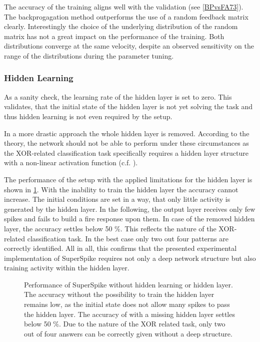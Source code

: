 The accuracy of the training aligns well with the validation (see \cref{BPvsFA73}). The backprogagation method outperforms the use of a random feedback matrix clearly. Interestingly the choice of the underlying distribution of the random matrix has not a great impact on the performance of the training. Both distributions converge at the same velocity, despite an observed sensitivity on the range of the distributions during the parameter tuning.

\subsubsection*{Hidden Learning}
As a sanity check, the learning rate of the hidden layer is set to zero. This validates, that the initial state of the hidden layer is not yet solving the task and thus hidden learning is not even required by the setup.

In a more drastic approach the whole hidden layer is removed. According to the theory, the network should not be able to perform under these circumstances as the XOR-related classification task specifically requires a hidden layer structure with a non-linear activation function (c.f. \citealp{Goodfellow-et-al-2016}).

The performance of the setup with the applied limitations for the hidden layer is shown in \cref{hiddenlearning}. With the inability to train the hidden layer the accuracy cannot increase. The initial conditions are set in a way, that only little activity is generated by the hidden layer. In the following, the output layer receives only few spikes and fails to build a fire response upon them. In case of the removed hidden layer, the accuracy settles below 50 \%. This reflects the nature of the XOR-related classification task. In the best case only two out four patterns are correctly identified. 
All in all, this confirms that the presented experimental implementation of SuperSpike requires not only a deep network structure but also training activity within the hidden layer.

\begin{figure}[htb!]
		\centering
		
	\caption[Performance of SuperSpike without hidden learning or hidden layer.]{Performance of SuperSpike without hidden learning or hidden layer. The accuracy without the possibility to train the hidden layer remains low, as the initial state does not allow many spikes to pass the hidden layer. The accuracy of with a missing hidden layer settles below 50 \%. Due to the nature of the XOR related task, only two out of four answers can be correctly given without a deep structure.}
	\label{hiddenlearning}
\end{figure}

